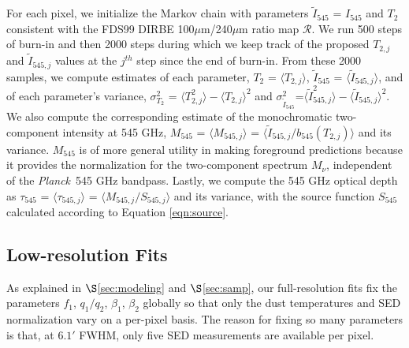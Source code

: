 \documentclass{emulateapj}
\newcommand{\PLANCK}{{\it Planck}}
\begin{document}
For each pixel, we initialize the Markov chain with parameters 
$\tilde{I}_{545}$ = $I_{545}$ and $T_2$ consistent with the FDS99 
DIRBE 100$\mu$m/240$\mu$m ratio map $\mathscr{R}$. We run 500 steps of burn-in 
and then 2000 steps during which we keep track of the proposed $T_{2, j}$ and 
$\tilde{I}_{545, j}$ values at the $j^{th}$ step since the end of burn-in. From
 these 2000 samples, we compute estimates of each parameter, 
$T_2$ = $\langle T_{2, j} \rangle$, $\tilde{I}_{545}$ = 
$\langle \tilde{I}_{545, j} \rangle$, and of each parameter's variance, 
$\sigma^2_{T_2}$ = $\langle T^2_{2, j} \rangle-\langle T_{2, j} \rangle ^2$ and
 $\sigma^2_{\tilde{I}_{545}}$=$\langle \tilde{I}^2_{545, j} 
\rangle-\langle \tilde{I}_{545, j} \rangle ^2$. We also compute the
 corresponding estimate of the monochromatic two-component intensity at 545 
GHz, $M_{545}$ = $\langle M_{545, j} \rangle$ = 
$\langle \tilde{I}_{545, j}/b_{545}(T_{2,j}) \rangle$  and its variance. 
$M_{545}$ is of more general utility in making foreground predictions because 
it provides the normalization for the two-component spectrum $M_{\nu}$, 
independent of the \PLANCK~545 GHz bandpass. Lastly, we compute the 545 GHz
optical depth as $\tau_{545}$ = $\langle \tau_{545, j} \rangle$ = 
$\langle M_{545, j}/S_{545, j} \rangle$ and its variance, with the source 
function $S_{545}$ calculated according to Equation \ref{eqn:source}.



\subsection{Low-resolution Fits}
\label{sec:lores}

As explained in $\S$\ref{sec:modeling} and $\S$\ref{sec:samp}, our 
full-resolution fits fix the parameters $f_1$, $q_1/q_2$, $\beta_1$, $\beta_2$ 
globally so that only the dust temperatures and SED normalization vary on a 
per-pixel basis. The reason for fixing so many parameters is that, at $6.1'$
FWHM, only five SED measurements are available per pixel.
\end{document}
